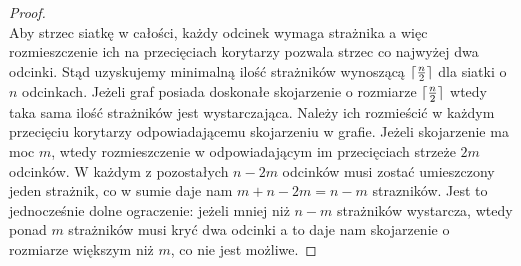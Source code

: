 \documentclass[brudnopis]{xmgr}
\DeclarePairedDelimiter\ceil{\lceil}{\rceil}
\begin{document}
\begin{proof}
 \\\indent Aby strzec siatkę w całości, każdy odcinek wymaga strażnika a więc rozmieszczenie ich na przecięciach korytarzy pozwala strzec co najwyżej dwa odcinki. Stąd uzyskujemy minimalną ilość strażników wynoszącą $\ceil{\frac{n}{2}}$ dla siatki o $n$ odcinkach. Jeżeli graf posiada doskonałe skojarzenie o rozmiarze $\ceil{\frac{n}{2}}$ wtedy taka sama ilość strażników jest wystarczająca. Należy ich rozmieścić w każdym przecięciu korytarzy odpowiadającemu skojarzeniu w grafie. Jeżeli skojarzenie ma moc $m$, wtedy rozmieszczenie w odpowiadającym im przecięciach strzeże $2m$ odcinków. W każdym z pozostałych $n - 2m$ odcinków musi zostać umieszczony jeden strażnik, co w sumie daje nam $m + n - 2m = n - m$ strazników. Jest to jednocześnie dolne ograczenie: jeżeli mniej niż $n - m$ strażników wystarcza, wtedy ponad $m$ strażników musi kryć dwa odcinki a to daje nam skojarzenie o rozmiarze większym niż $m$, co nie jest możliwe.
\end{proof}
\end{document}
